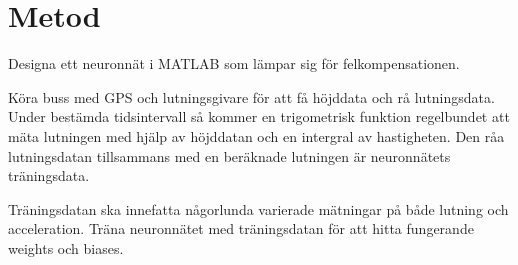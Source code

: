 \section{Metod}

Designa ett neuronnät i MATLAB som lämpar sig för felkompensationen.

Köra buss med GPS och lutningsgivare för att få höjddata och rå lutningsdata. Under bestämda tidsintervall så kommer en trigometrisk funktion regelbundet att mäta lutningen med hjälp av höjddatan och en intergral av hastigheten. 
Den råa lutningsdatan tillsammans med en beräknade lutningen är neuronnätets träningsdata.

Träningsdatan ska innefatta någorlunda varierade mätningar på både lutning och acceleration.
Träna neuronnätet med träningsdatan för att hitta fungerande weights och biases.
